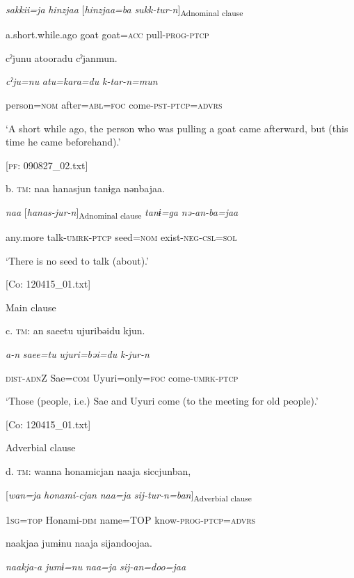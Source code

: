       \textit{sakkii=ja}  \textit{hinzjaa}    [\textit{hinzjaa=ba}  \textit{sukk-tur-n}]\textsubscript{Adnominal clause}

      a.short.while.ago  goat    goat=\textsc{acc}  pull-\textsc{prog}-\textsc{ptcp}

      cˀjunu  atooradu  cˀjanmun.

      \textit{cˀju=nu}  \textit{atu=kara=du}  \textit{k-tar-n=mun}

      person=\textsc{nom}  after=\textsc{abl}=\textsc{foc}  come-\textsc{pst}-\textsc{ptcp}=\textsc{advrs}

      ‘A short while ago, the person who was pulling a goat came afterward, but (this time he came beforehand).’

      [\textsc{pf}: 090827\_02.txt]

  b.  \textsc{tm}:  naa  hanasjun  tanɨga  nənbajaa.

      \textit{naa}  [\textit{hanas-jur-n}]\textsubscript{Adnominal clause}  \textit{tanɨ=ga}  \textit{nə-an-ba=jaa}

      any.more  talk-\textsc{umrk}-\textsc{ptcp}  seed=\textsc{nom}  exist-\textsc{neg}-\textsc{csl}=\textsc{sol}

      ‘There is no seed to talk (about).’

      [Co: 120415\_01.txt]

  Main clause

  c.  \textsc{tm}:  an  saeetu  ujuribəidu  kjun.

      \textit{a-n}  \textit{saee=tu}  \textit{ujuri=bəi=du}  \textit{k-jur-n}

      \textsc{dist}-\textsc{adn}Z  Sae=\textsc{com}  Uyuri=only=\textsc{foc}  come-\textsc{umrk}-\textsc{ptcp}

      ‘Those (people, i.e.) Sae and Uyuri come (to the meeting for old people).’

      [Co: 120415\_01.txt]

  Adverbial clause

  d.  \textsc{tm}:  wanna  honami{\textbar}cjan{\textbar}  naaja  siccjunban,

      [\textit{wan=ja}  \textit{honami-cjan}  \textit{naa=ja}  \textit{sij-tur-n=ban}]\textsubscript{Adverbial clause}

      1\textsc{sg}=\textsc{top}  Honami-\textsc{dim}  name=TOP  know-\textsc{prog}-\textsc{ptcp}=\textsc{advrs}

      naakjaa  jumɨnu  naaja  sijandoojaa.

      \textit{naakja-a}  \textit{jumɨ=nu}  \textit{naa=ja}  \textit{sij-an=doo=jaa}

